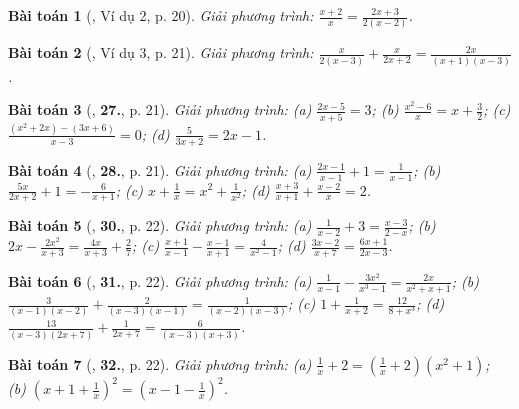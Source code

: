 \documentclass{article}
\numberwithin{equation}{section}
\newtheorem{baitoan}{Bài toán}
\begin{document}
\begin{baitoan}[\cite{SGK_Toan_8_tap_2}, Ví dụ 2, p. 20]
	Giải phương trình: $\frac{x + 2}{x} = \frac{2x + 3}{2(x - 2)}$.
\end{baitoan}

\begin{baitoan}[\cite{SGK_Toan_8_tap_2}, Ví dụ 3, p. 21]
	Giải phương trình: $\frac{x}{2(x - 3)} + \frac{x}{2x + 2} = \frac{2x}{(x + 1)(x - 3)}$.
\end{baitoan}

\begin{baitoan}[\cite{SGK_Toan_8_tap_2}, \textbf{27.}, p. 21]
	Giải phương trình: (a) $\frac{2x - 5}{x + 5} = 3$; (b) $\frac{x^2 - 6}{x} = x + \frac{3}{2}$; (c) $\frac{(x^2 + 2x) - (3x + 6)}{x - 3} = 0$; (d) $\frac{5}{3x + 2} = 2x - 1$.
\end{baitoan}

\begin{baitoan}[\cite{SGK_Toan_8_tap_2}, \textbf{28.}, p. 21]
	Giải phương trình: (a) $\frac{2x - 1}{x - 1} + 1 = \frac{1}{x - 1}$; (b) $\frac{5x}{2x + 2} + 1 = -\frac{6}{x + 1}$; (c) $x + \frac{1}{x} = x^2 + \frac{1}{x^2}$; (d) $\frac{x + 3}{x + 1} + \frac{x - 2}{x} = 2$.
\end{baitoan}

\begin{baitoan}[\cite{SGK_Toan_8_tap_2}, \textbf{30.}, p. 22]
	Giải phương trình: (a) $\frac{1}{x - 2} + 3 = \frac{x - 3}{2 - x}$; (b) $2x - \frac{2x^2}{x + 3} = \frac{4x}{x + 3} + \frac{2}{7}$; (c) $\frac{x + 1}{x - 1} - \frac{x - 1}{x + 1} = \frac{4}{x^2 - 1}$; (d) $\frac{3x - 2}{x + 7} = \frac{6x + 1}{2x - 3}$.
\end{baitoan}

\begin{baitoan}[\cite{SGK_Toan_8_tap_2}, \textbf{31.}, p. 22]
	Giải phương trình: (a) $\frac{1}{x - 1} - \frac{3x^2}{x^3 - 1} = \frac{2x}{x^2 + x + 1}$; (b) $\frac{3}{(x - 1)(x - 2)} + \frac{2}{(x - 3)(x - 1)} = \frac{1}{(x - 2)(x - 3)}$; (c) $1 + \frac{1}{x + 2} = \frac{12}{8 + x^3}$; (d) $\frac{13}{(x - 3)(2x + 7)} + \frac{1}{2x + 7} = \frac{6}{(x - 3)(x + 3)}$.
\end{baitoan}

\begin{baitoan}[\cite{SGK_Toan_8_tap_2}, \textbf{32.}, p. 22]
	Giải phương trình: (a) $\frac{1}{x} + 2 = \left(\frac{1}{x} + 2\right)(x^2 + 1)$; (b) $\left(x + 1 + \frac{1}{x}\right)^2 = \left(x - 1 - \frac{1}{x}\right)^2$.
\end{baitoan}
\end{document}
